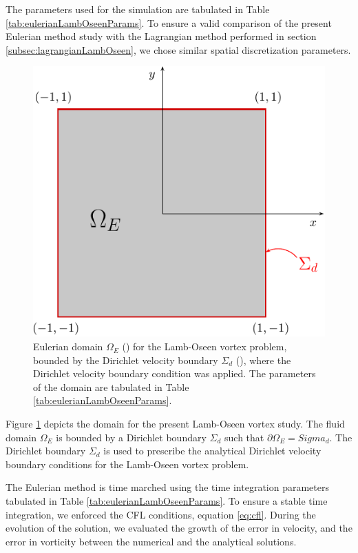 The parameters used for the simulation are tabulated in Table \ref{tab:eulerianLambOseenParams}. To ensure a valid comparison of the present Eulerian method study with the Lagrangian method performed in section \ref{subsec:lagrangianLambOseen}, we chose similar spatial discretization parameters.

	\begin{figure}[!t]
	\centering
	\includegraphics[width=0.5\linewidth]{./figures/eulerian/lambOseenDomainDefinition-crop.pdf}
	\caption{Eulerian domain $\Omega_E$ ({}) for the Lamb-Oseen vortex problem, bounded by the Dirichlet velocity boundary $\Sigma_d$ ({}), where the Dirichlet velocity boundary condition was applied. The parameters of the domain are tabulated in Table \ref{tab:eulerianLambOseenParams}.}
	\label{fig:lambOseenDomainDefinition}
	\end{figure}

Figure \ref{fig:lambOseenDomainDefinition} depicts the domain for the present Lamb-Oseen vortex study. The fluid domain $\Omega_E$ is bounded by a Dirichlet boundary $\Sigma_d$ such that $\partial \Omega_E = Sigma_d$. The Dirichlet boundary $\Sigma_d$ is used to prescribe the analytical Dirichlet velocity boundary conditions for the Lamb-Oseen vortex problem.
 
The Eulerian method is time marched using the time integration parameters tabulated in Table \ref{tab:eulerianLambOseenParams}. To ensure a stable time integration, we enforced the CFL conditions, equation \ref{eq:cfl}. During the evolution of the solution, we evaluated the growth of the error in velocity, and the error in vorticity between the numerical and the analytical solutions.




